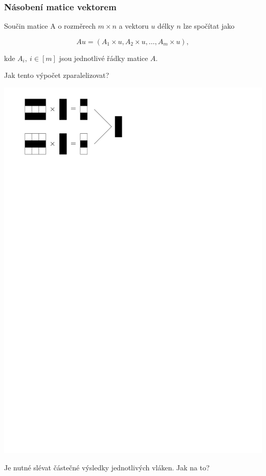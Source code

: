 \documentclass[usenames,dvipsnames,9pt]{beamer}
\begin{document}
\begin{frame}
  \frametitle{Násobení matice vektorem}
  
  Součin matice A o rozměrech $m \times n$ a vektoru $u$ délky $n$ lze spočítat jako 
  
    \begin{equation*}
  Au = (A_1\times u, A_2 \times u, \dots, A_m \times u),
  \end{equation*}
  
  kde $A_i,~i\in [m]$ jsou jednotlivé řádky matice $A$.
  
   \pause\vspace{1em}
  
  \begin{center}
  \Large Jak tento výpočet zparalelizovat?
  \end{center}
  
  \pause
  
  \begin{center}
\includegraphics[width=0.5\linewidth]{08/figs/mmult.pdf}
\end{center}

Je nutné slévat částečné výsledky jednotlivých vláken. Jak na to?
  

\end{frame}
\end{document}
